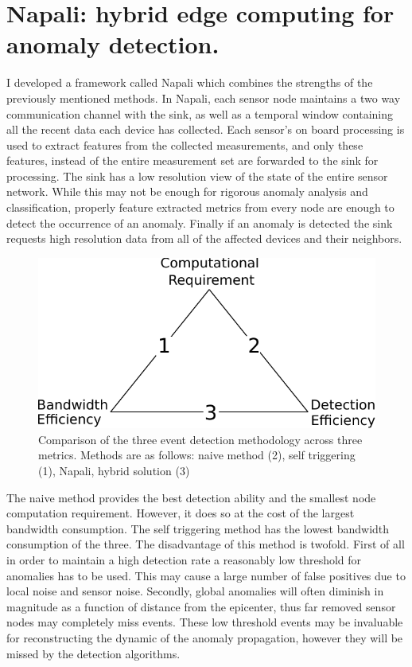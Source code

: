 \section{Napali: hybrid edge computing for anomaly detection.} \label{intro:section:napali}

I developed a framework called Napali which combines the strengths of the previously mentioned methods.
In Napali, each sensor node maintains a two way communication channel with the sink, as well as a temporal window containing all the recent data each device has collected.
Each sensor's on board processing is used to extract features from the collected measurements, and only these features, instead of the entire measurement set are forwarded to the sink for processing.
The sink has a low resolution view of the state of the entire sensor network.
While this may not be enough for rigorous anomaly analysis and classification, properly feature extracted metrics from every node are enough to detect the occurrence of an anomaly.
Finally if an anomaly is detected the sink requests high resolution data from all of the affected devices and their neighbors.

\begin{figure}[h]
    \centering
    \includegraphics[width=0.5\linewidth]{img/edge_computing_vs.pdf}
    \caption{Comparison of the three event detection methodology across three metrics.
    Methods are as follows: naive method (2), self triggering (1), Napali, hybrid solution (3)}
    \label{intro:fig:edge}
\end{figure}
The naive method provides the best detection ability and the smallest node computation requirement.
However, it does so at the cost of the largest bandwidth consumption.
The self triggering method has the lowest bandwidth consumption of the three.
The disadvantage of this method is twofold.
First of all in order to maintain a high detection rate a reasonably low threshold for anomalies has to be used.
This may cause a large number of false positives due to local noise and sensor noise.
Secondly, global anomalies will often diminish in magnitude as a function of distance from the epicenter, thus far removed sensor nodes may completely miss events.
These low threshold events may be invaluable for reconstructing the dynamic of the anomaly propagation, however they will be missed by the detection algorithms.


